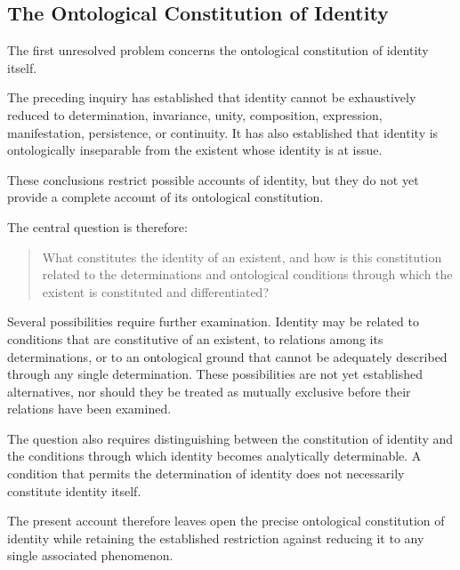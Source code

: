 
\subsection{The Ontological Constitution of Identity}

The first unresolved problem concerns the ontological
constitution of identity itself.

The preceding inquiry has established that identity
cannot be exhaustively reduced to determination,
invariance, unity, composition, expression, manifestation,
persistence, or continuity. It has also established that
identity is ontologically inseparable from the existent
whose identity is at issue.

These conclusions restrict possible accounts of identity,
but they do not yet provide a complete account of its
ontological constitution.

The central question is therefore:

\begin{quote}
What constitutes the identity of an existent, and how
is this constitution related to the determinations and
ontological conditions through which the existent is
constituted and differentiated?
\end{quote}

Several possibilities require further examination.
Identity may be related to conditions that are
constitutive of an existent, to relations among its
determinations, or to an ontological ground that cannot
be adequately described through any single determination.
These possibilities are not yet established alternatives,
nor should they be treated as mutually exclusive before
their relations have been examined.

The question also requires distinguishing between the
constitution of identity and the conditions through
which identity becomes analytically determinable.
A condition that permits the determination of identity
does not necessarily constitute identity itself.

The present account therefore leaves open the precise
ontological constitution of identity while retaining
the established restriction against reducing it to
any single associated phenomenon.


